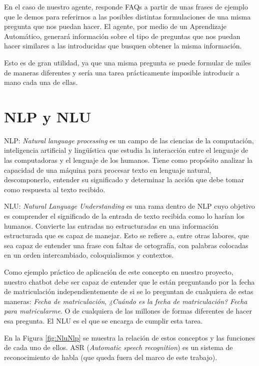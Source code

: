 En el caso de nuestro agente, responde FAQs a partir de unas frases de ejemplo que le demos para referirnos a las posibles distintas formulaciones de una misma pregunta que nos puedan hacer. El agente, por medio de un Aprendizaje Automático, generará información sobre el tipo de preguntas que nos puedan hacer similares a las introducidas que busquen obtener la misma información.

Esto es de gran utilidad, ya que una misma pregunta se puede formular de miles de maneras diferentes y sería una tarea prácticamente imposible introducir a mano cada una de ellas.

\newpage

\section{NLP y NLU}

NLP: \textit{Natural language processing} es un campo de las ciencias de la computación, inteligencia artificial y lingüística que estudia la interacción entre el lenguaje de las computadoras y el lenguaje de los humanos. Tiene como propósito analizar la capacidad de una máquina para procesar texto en lenguaje natural, descomponerlo, entender su significado y determinar la acción que debe tomar como respuesta al texto recibido.


NLU: \textit{Natural Language Understanding} es una rama dentro de NLP cuyo objetivo es comprender el significado de la entrada de texto recibida como lo harían los humanos. Convierte las entradas no estructuradas en una información estructurada que es capaz de manejar. Esto se refiere a, entre otras labores, que sea capaz de entender una frase con faltas de ortografía, con palabras colocadas en un orden intercambiado, coloquialismos y contextos.

Como ejemplo práctico de aplicación de este concepto en nuestro proyecto, nuestro chatbot debe ser capaz de entender que le están preguntando por la fecha de matriculación independientemente de si se lo preguntan de cualquiera de estas maneras: \textit{Fecha de matriculación}, \textit{¿Cuándo es la fecha de matriculación?} \textit{Fecha para matricularme}. O de cualquiera de las millones de formas diferentes de hacer esa pregunta. El NLU es el que se encarga de cumplir esta tarea.


En la Figura \ref{fig:NluNlp} se muestra la relación de estos conceptos y las funciones de cada uno de ellos.
ASR (\textit{Automatic speech recognition}) es un sistema de reconocimiento de habla (que queda fuera del marco de este trabajo).

